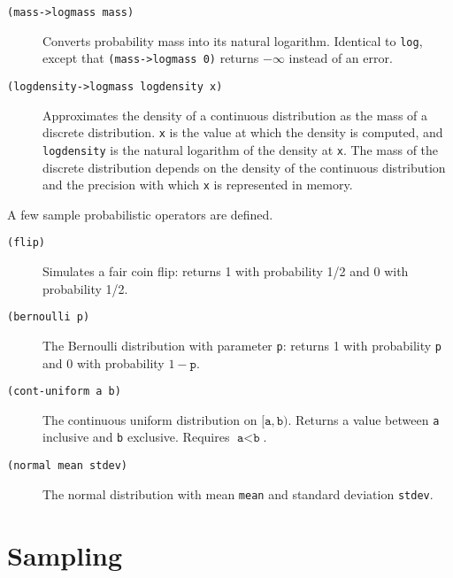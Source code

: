 \documentclass{article}
\begin{document}
\begin{description}
  \item[\texttt{(mass->logmass mass)}] \hfill

    Converts probability mass into its natural logarithm. Identical to
    \texttt{log}, except that \texttt{(mass->logmass 0)} returns
    $-\infty$ instead of an error.

  \item[\texttt{(logdensity->logmass logdensity x)}] \hfill

    Approximates the density of a continuous distribution as the mass
    of a discrete distribution. \texttt{x} is the value at which the
    density is computed, and \texttt{logdensity} is the natural
    logarithm of the density at \texttt{x}. The mass of the discrete
    distribution depends on the density of the continuous distribution
    and the precision with which \texttt{x} is represented in memory.
\end{description}

A few sample probabilistic operators are defined.

\begin{description}

\item[\texttt{(flip)}] \hfill

  Simulates a fair coin flip: returns 1 with probability 1/2 and 0
  with probability 1/2.

\item[\texttt{(bernoulli p)}] \hfill

  The Bernoulli distribution with parameter \texttt{p}: returns 1 with
  probability \texttt{p} and 0 with probability $1-\texttt{p}$.

\item[\texttt{(cont-uniform a b)}] \hfill

  The continuous uniform distribution on
  $[\texttt{a},\texttt{b})$. Returns a value between \texttt{a}
  inclusive and \texttt{b} exclusive. Requires $\texttt{a} <
  \texttt{b}$.

\item[\texttt{(normal mean stdev)}] \hfill

  The normal distribution with mean \texttt{mean} and standard
  deviation \texttt{stdev}.

\end{description}

\section{Sampling}
\label{sec:sampling}
\end{document}
